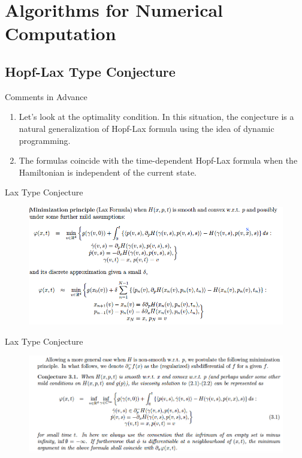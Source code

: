 \documentclass[english]{pkuslide}
\begin{document}
\section{Algorithms for Numerical Computation}
	\frame{\sectionpage}
\subsection{Hopf-Lax Type Conjecture}
\begin{frame}{Comments in Advance}
\begin{enumerate}[<+->]
\item Let's look at the optimality condition. In this situation, the conjecture is a natural generalization of Hopf-Lax formula using the idea of dynamic programming.
\item The formulas coincide with the time-dependent Hopf-Lax formula when the Hamiltonian is independent of the current state.
\end{enumerate}

\end{frame}
	\begin{frame}{Lax Type Conjecture}
\begin{figure}
\centering
\includegraphics[height=0.5\textheight]{1.png}
\end{figure}
	\end{frame}
\begin{frame}{Lax Type Conjecture}
\begin{figure}
\centering
\includegraphics[height=0.5\textheight]{2.png}
\end{figure}

	\end{frame}
\end{document}
